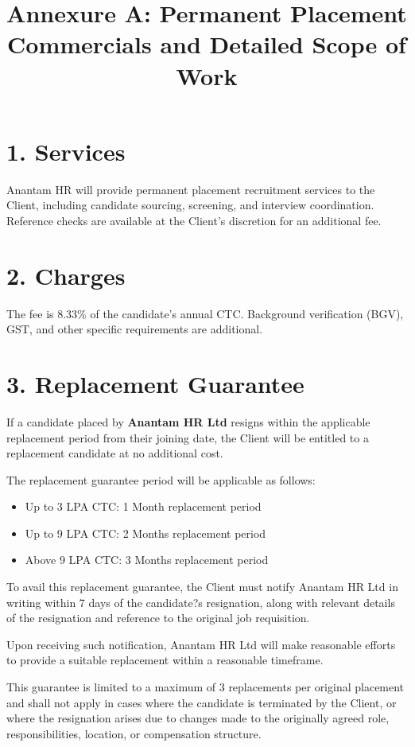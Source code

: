 \documentclass{article}
\title{Annexure A: Permanent Placement Commercials and Detailed Scope of Work}
\date{}
\begin{document}
\maketitle

\section*{1. Services}
Anantam HR will provide permanent placement recruitment services to the Client, including candidate sourcing, screening, and interview coordination. Reference checks are available at the Client's discretion for an additional fee.

\section*{2. Charges}
The fee is 8.33\% of the candidate's annual CTC. Background verification (BGV), GST, and other specific requirements are additional.

\section*{3. Replacement Guarantee}

If a candidate placed by \textbf{Anantam HR Ltd} resigns within the applicable replacement period from their joining date, the Client will be entitled to a replacement candidate at no additional cost.

The replacement guarantee period will be applicable as follows:

\begin{itemize}
\item Up to 3 LPA CTC: 1 Month replacement period
\item Up to 9 LPA CTC: 2 Months replacement period
\item Above 9 LPA CTC: 3 Months replacement period
\end{itemize}

To avail this replacement guarantee, the Client must notify Anantam HR Ltd in writing within 7 days of the candidate?s resignation, along with relevant details of the resignation and reference to the original job requisition.

Upon receiving such notification, Anantam HR Ltd will make reasonable efforts to provide a suitable replacement within a reasonable timeframe.

This guarantee is limited to a maximum of 3 replacements per original placement and shall not apply in cases where the candidate is terminated by the Client, or where the resignation arises due to changes made to the originally agreed role, responsibilities, location, or compensation structure.
\end{document}
